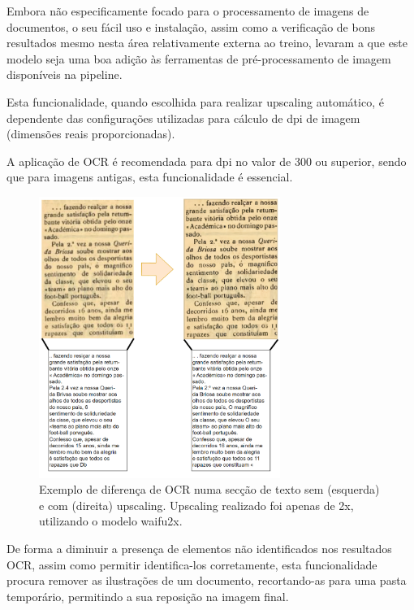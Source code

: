 Embora não especificamente focado para o processamento de imagens de documentos, o seu fácil uso e instalação, assim como a verificação de bons resultados mesmo nesta área relativamente externa ao treino, levaram a que este modelo seja uma boa adição às ferramentas de pré-processamento de imagem disponíveis na pipeline.

Esta funcionalidade, quando escolhida para realizar upscaling automático, é dependente das configurações utilizadas para cálculo de dpi de imagem (dimensões reais proporcionadas).

A aplicação de OCR é recomendada para dpi no valor de 300 ou superior, sendo que para imagens antigas, esta funcionalidade é essencial.


\begin{figure}[H]
	\centering
	\includegraphics[width=0.7\textwidth]{images/ilustracoes/upscaling_example.png}
	\caption{Exemplo de diferença de OCR numa secção de texto sem (esquerda) e com (direita) upscaling. Upscaling realizado foi apenas de 2x, utilizando o modelo waifu2x.}
	\label{fig:upscaling_example}
\end{figure}



De forma a diminuir a presença de elementos não identificados nos resultados OCR, assim como permitir identifica-los corretamente, esta funcionalidade procura remover as ilustrações de um documento, recortando-as para uma pasta temporário, permitindo a sua reposição na imagem final.

